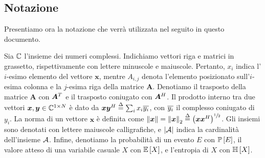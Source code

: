 \subsection*{Notazione}

Presentiamo ora la notazione che verrà utilizzata nel seguito in questo
documento.

Sia \(\mathbb{C}\) l'insieme dei numeri complessi. Indichiamo vettori riga e matrici in
grassetto, rispettivamente con lettere minuscole e maiuscole.  Pertanto,
\(x_i\) indica l'\(i\)-esimo elemento del vettore \(\bm{x}\), mentre
\(A_{i,j}\) denota l'elemento posizionato sull'\(i\)-esima colonna e la
\(j\)-esima riga della matrice \(\bm{A}\). Denotiamo il trasposto della matrice
\(\bm{A}\) con \(\bm{A}^{T}\) e il trasposto coniugato con \(\bm{A}^{H}\).  Il
prodotto interno tra due vettori \(\bm{x},\bm{y} \in \mathbb{C}^{1 \times N}\) è dato
da \(\bm{x}\bm{y}^{H} \overset{\Delta}{=} \sum_i x_i \overline{y_i}\), con \(\overline{y_i}\) il
complesso coniugato di \(y_i\). La norma di un vettore \(\bm{x}\) è definita
come \(\left\| \bm{x} \right\| = \left\| \bm{x} \right\|_2 \overset{\Delta}{=}
\left(\bm{x}\bm{x}^{H}\right)^{\sfrac{1}{2}}\). Gli insiemi sono denotati con
lettere maiuscole calligrafiche, e \(\left| \mathcal{A} \right|\) indica la cardinalità
dell'insieme \(\mathcal{A}\). Infine, denotiamo la probabilità di un evento \(E\)
con \(\mathbb{P}\left[ E \right]\), il valore atteso di una variabile casuale \(X\) con
\(\mathbb{E}\left[ X \right]\), e l'entropia di \(X\) con \(\mathbb{H}\left[ X \right]\).
